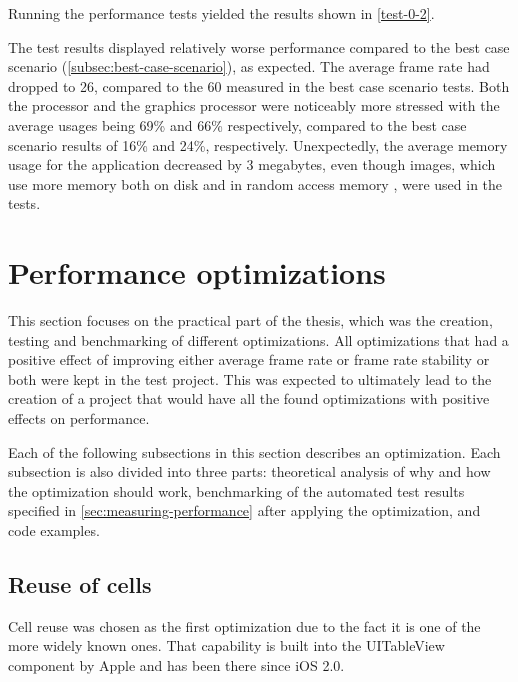 \documentclass[a4paper,12pt]{article}
\begin{document}
Running the performance tests yielded the results shown in \autoref{test-0-2}.

The test results displayed relatively worse performance compared to the best case scenario (\autoref{subsec:best-case-scenario}), as expected. The average frame rate had dropped to 26, compared to the 60 measured in the best case scenario tests. Both the processor and the graphics processor were noticeably more stressed with the average usages being 69\% and 66\% respectively, compared to the best case scenario results of 16\% and 24\%, respectively. Unexpectedly, the average memory usage for the application decreased by 3 megabytes, even though images, which use more memory both on disk and in random access memory \cite{UnderstandingFileSizes}, were used in the tests.

\section{Performance optimizations}
This section focuses on the practical part of the thesis, which was the creation, testing and benchmarking of different optimizations. All optimizations that had a positive effect of improving either average frame rate or frame rate stability or both were kept in the test project. This was expected to ultimately lead to the creation of a project that would have all the found optimizations with positive effects on performance.

Each of the following subsections in this section describes an optimization. Each subsection is also divided into three parts: theoretical analysis of why and how the optimization should work, benchmarking of the automated test results specified in \autoref{sec:measuring-performance} after applying the optimization, and code examples.

\subsection{Reuse of cells}
Cell reuse was chosen as the first optimization due to the fact it is one of the more widely known ones. That capability is built into the UITableView component by Apple and has been there since iOS 2.0.\cite{HackingWithSwiftCellReuse}
\end{document}
